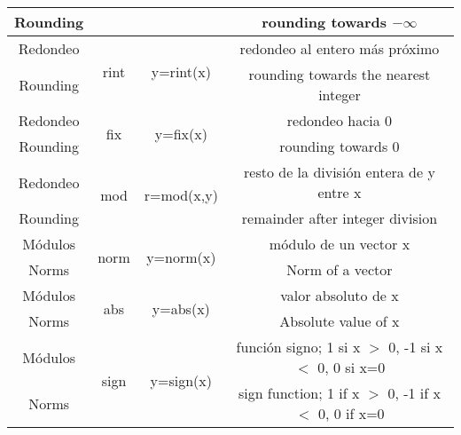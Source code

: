 \begin{table}[h]
\begin{tabular}{c|c|c|c}
Rounding& & & rounding towards $-\infty$ \\
\hline
Redondeo&\multirow{2}{*}{rint}&\multirow{2}{*}{y=rint(x)}&redondeo al entero más próximo\\
Rounding& & & rounding towards the nearest integer\\
\hline
Redondeo&\multirow{2}{*}{fix}&\multirow{2}{*}{y=fix(x)}&redondeo hacia $0$\\
Rounding& & & rounding towards $0$\\
\hline
Redondeo&\multirow{2}{*}{mod}&\multirow{2}{*}{r=mod(x,y)}&resto de la división entera de y entre x\\
Rounding& & & remainder after integer division\\
\hline
\hline
Módulos&\multirow{2}{*}{norm}&\multirow{2}{*}{y=norm(x)}& módulo de un vector x\\
Norms & & & Norm of a vector\\
\hline
Módulos&\multirow{2}{*}{abs}&\multirow{2}{*}{y=abs(x)}&valor absoluto de x\\
Norms & & & Absolute value of x\\
\hline
Módulos&\multirow{2}{*}{sign}&\multirow{2}{*}{y=sign(x)}&función signo; 1 si x $>$ 0, -1 si x $<$ 0, 0 si x=0\\
Norms & & &sign function; 1 if x $>$ 0, -1 if x $<$ 0, 0 if x=0\\ 
\end{tabular}
\end{table}

